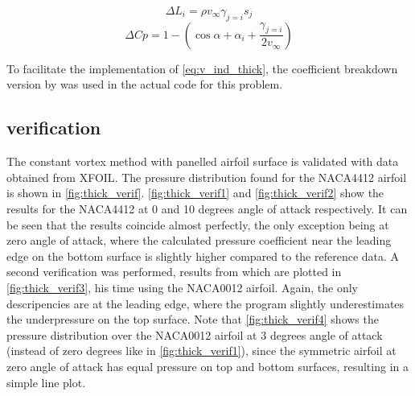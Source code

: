 \begin{equation}
\label{eq:thick_lift}
\Delta L_i = \rho v_\infty \gamma_{j=i} s_j
\end{equation}
\medskip
\begin{equation}
\label{eq:thick_press}
\Delta Cp = 1 - \left( \cos{\alpha+\alpha_i} + \frac{ \gamma_{j=i} }{ 2 v_\infty } \right)
\end{equation}
\medskip

To facilitate the implementation of \autoref{eq:v_ind_thick}, the coefficient
breakdown version by \citeauthor{kuethe_chow_1998} was used in the actual code
for this problem.

\subsection{verification}
The constant vortex method with panelled airfoil surface is validated with data
obtained from XFOIL\cite{xfoil}. The pressure distribution found for the
NACA4412 airfoil is shown in \autoref{fig:thick_verif}.
\autoref{fig:thick_verif1} and \autoref{fig:thick_verif2} show the results for
the NACA4412 at 0 and 10 degrees angle of attack respectively. It can be seen
that the results coincide almost perfectly, the only exception being at zero
angle of attack, where the calculated pressure coefficient near the leading edge
on the bottom surface is slightly higher compared to the reference data. A
second verification was performed, results from which are plotted in
\autoref{fig:thick_verif3}, his time using the NACA0012 airfoil. Again, the
only descripencies are at the leading edge, where the program slightly
underestimates the underpressure on the top surface. Note that
\autoref{fig:thick_verif4} shows the pressure distribution over the NACA0012
airfoil at 3 degrees angle of attack (instead of zero degrees like in
\autoref{fig:thick_verif1}), since the symmetric airfoil at zero angle of attack
has equal pressure on top and bottom surfaces, resulting in a simple line plot.

